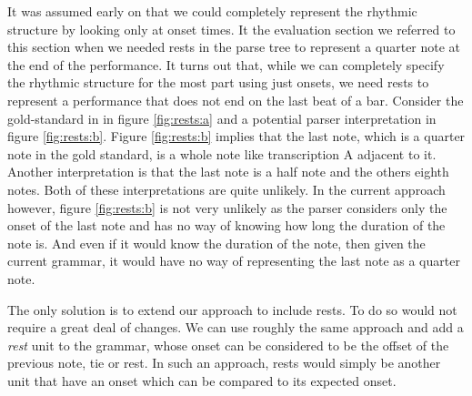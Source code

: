 It was assumed early on that we could completely represent the rhythmic structure by looking only at onset times. It the evaluation section we referred to this section when we needed rests in the parse tree to represent a quarter note at the end of the performance. It turns out that, while we can completely specify the rhythmic structure for the most part using just onsets, we need rests to represent a performance that does not end on the last beat of a bar. Consider the gold-standard in in figure \ref{fig:rests:a} and a potential parser interpretation in figure \ref{fig:rests:b}. Figure \ref{fig:rests:b} implies that the last note, which is a quarter note in the gold standard, is a whole note like transcription A adjacent to it. Another interpretation is that the last note is a half note and the others eighth notes. Both of these interpretations are quite unlikely. In the current approach however, figure \ref{fig:rests:b} is not very unlikely as the parser considers only the onset of the last note and has no way of knowing how long the duration of the note is. And even if it would know the duration of the note, then given the current grammar, it would have no way of representing the last note as a quarter note. 

The only solution is to extend our approach to include rests. To do so would not require a great deal of changes. We can use roughly the same approach and add a \textit{rest} unit to the grammar, whose onset can be considered to be the offset of the previous note, tie or rest. In such an approach, rests would simply be another unit that have an onset which can be compared to its expected onset.

